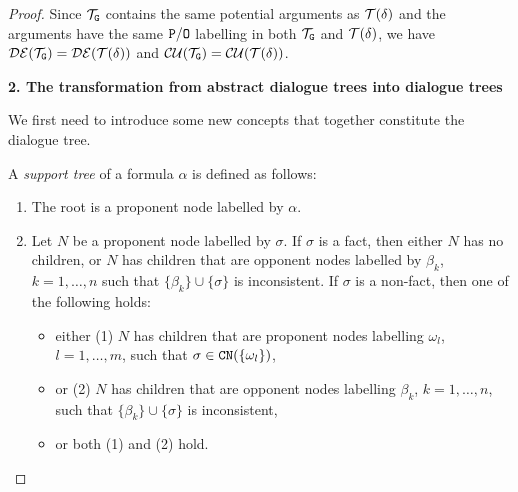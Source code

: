 \begin{proof}
Since $\mathcal{T}_{\texttt{\textup{G}}}$ contains the same potential arguments as $\mathcal{T}(\delta)$ and the arguments have the same $\texttt{\textup{P}} / \texttt{\textup{O}}$ labelling in both $\mathcal{T}_{\texttt{\textup{G}}}$ and $\mathcal{T}(\delta)$, we have $\mathcal{DE}(\mathcal{T}_{\texttt{\textup{G}}})  =  \mathcal{DE}(\mathcal{T}(\delta))$ and $ \mathcal{CU}(\mathcal{T}_{\texttt{\textup{G}}})  =  \mathcal{CU}(\mathcal{T}(\delta))$.

\textbf{2. The transformation from abstract dialogue trees into dialogue trees}

We first need to introduce some new concepts that together constitute the dialogue tree.

\begin{definition} 
A \emph{support tree} of a formula $\alpha$ is defined as follows:
\begin{enumerate}
    \item The root is a proponent node labelled by $\alpha$.
    \item Let $N$ be a proponent node labelled by $\sigma$. If $\sigma$ is a fact, then either $N$ has no children, or $N$ has children that are opponent nodes labelled by $\beta_k$, $k = 1, \ldots, n$ such that $\{ \beta_k \} \cup \{ \sigma \}$ is inconsistent.
     If $\sigma$ is a non-fact, then one of the following holds:
     \begin{itemize}
         \item either (1) $N$ has children that are proponent nodes labelling $\omega_l$, $l = 1, \dots, m$, such that $\sigma \in \texttt{\textup{CN}}(\{ \omega_l \})$,
         \item or (2) $N$ has children that are opponent nodes labelling $\beta_k$, $k = 1, \ldots, n$, such that $\{ \beta_k \} \cup \{ \sigma \}$ is inconsistent,
         \item or both (1) and (2) hold.
     \end{itemize}
\end{enumerate}   
\end{definition}


\end{proof}

